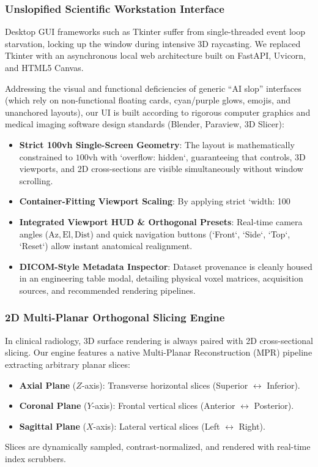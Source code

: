 \documentclass[10pt,twocolumn,a4paper]{article}
\begin{document}
\subsubsection{Unslopified Scientific Workstation Interface}
Desktop GUI frameworks such as Tkinter suffer from single-threaded event loop starvation, locking up the window during intensive 3D raycasting. We replaced Tkinter with an asynchronous local web architecture built on FastAPI, Uvicorn, and HTML5 Canvas.

Addressing the visual and functional deficiencies of generic ``AI slop'' interfaces (which rely on non-functional floating cards, cyan/purple glows, emojis, and unanchored layouts), our UI is built according to rigorous computer graphics and medical imaging software design standards (Blender, Paraview, 3D Slicer):
\begin{itemize}
    \item \textbf{Strict 100vh Single-Screen Geometry}: The layout is mathematically constrained to $100\text{vh}$ with `overflow: hidden`, guaranteeing that controls, 3D viewports, and 2D cross-sections are visible simultaneously without window scrolling.
    \item \textbf{Container-Fitting Viewport Scaling}: By applying strict `width: 100%
    \item \textbf{Integrated Viewport HUD \& Orthogonal Presets}: Real-time camera angles ($\text{Az}, \text{El}, \text{Dist}$) and quick navigation buttons (`Front`, `Side`, `Top`, `Reset`) allow instant anatomical realignment.
    \item \textbf{DICOM-Style Metadata Inspector}: Dataset provenance is cleanly housed in an engineering table modal, detailing physical voxel matrices, acquisition sources, and recommended rendering pipelines.
\end{itemize}

\subsubsection{2D Multi-Planar Orthogonal Slicing Engine}
In clinical radiology, 3D surface rendering is always paired with 2D cross-sectional slicing. Our engine features a native Multi-Planar Reconstruction (MPR) pipeline extracting arbitrary planar slices:
\begin{itemize}
    \item \textbf{Axial Plane} ($Z$-axis): Transverse horizontal slices (Superior $\leftrightarrow$ Inferior).
    \item \textbf{Coronal Plane} ($Y$-axis): Frontal vertical slices (Anterior $\leftrightarrow$ Posterior).
    \item \textbf{Sagittal Plane} ($X$-axis): Lateral vertical slices (Left $\leftrightarrow$ Right).
\end{itemize}
Slices are dynamically sampled, contrast-normalized, and rendered with real-time index scrubbers.
\end{document}
